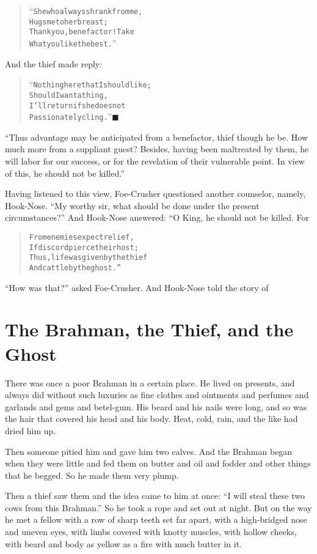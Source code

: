 \documentclass[article, twoside, 14pt]{memoir}
\newcommand{\qed}{\hfill \ensuremath{\blacksquare}}
\renewenvironment{verbatim}{%
\begin{quote}%
\vskip -10pt%
\begin{alltt}\normalfont\large}{\end{alltt}%
\end{quote}%
\vskip -10pt
} %
\begin{document}
\begin{verbatim}
“She who always shrank from me,
Hugs me to her breast;
Thank you, benefactor! Take
What you like the best.”
\end{verbatim}
And the thief made reply:

\begin{verbatim}
“Nothing here that I should like;
Should I want a thing,
I'll return if she does not
Passionately cling.”\hyperref[s56]{\qed}
\end{verbatim}
``Thus advantage may be anticipated from a benefactor, thief though he be. How much more from a suppliant guest? Besides, having been maltreated by them, he will labor for our success, or for the revelation of their vulnerable point. In view of this, he should not be killed.''

Having listened to this view, Foe-Crusher questioned another
counselor, namely, Hook-Nose.
``My worthy sir, what should be done under the present circumstances?''
And Hook-Nose answered: “O King, he should not be killed. For

\begin{verbatim}
From enemies expect relief,
    If discord pierce their host;
Thus, life was given by the thief
    And cattle by the ghost.”
\end{verbatim}
``How was that?'' asked Foe-Crusher. And Hook-Nose told the story
of

\chapter{The Brahman, the Thief, and the Ghost}

\label{s57}

There was once a poor Brahman in a certain place. He lived on
presents, and always did without such luxuries as fine clothes and
ointments and perfumes and garlands and gems and betel-gum. His
beard and his nails were long, and so was the hair that covered his
head and his body. Heat, cold, rain, and the like had dried him
up.

Then someone pitied him and gave him two calves. And the Brahman
began when they were little and fed them on butter and oil and
fodder and other things that he begged. So he made them very
plump.

Then a thief saw them and the idea came to him at once:
``I will steal these two cows from this Brahman.'' So he took
a rope and set out at night. But on the way he met a fellow with a
row of sharp teeth set far apart, with a high-bridged nose and
uneven eyes, with limbs covered with knotty muscles, with hollow
cheeks, with beard and body as yellow as a fire with much butter in
it.
\end{document}

